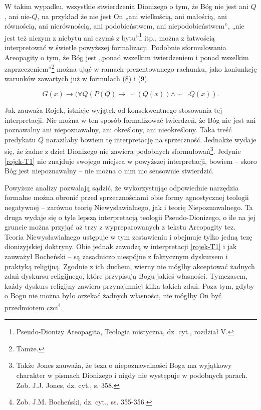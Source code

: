 W takim wypadku, wszystkie stwierdzenia Dionizego o tym, że Bóg nie jest
ani $Q$, ani nie-$Q$, na przykład że nie jest On „ani wielkością, ani
małością, ani równością, ani nierównością, ani podobieństwem, ani
niepodobieństwem”, „nie jest też niczym z niebytu ani czymś z
bytu”\footnote{Pseudo-Dionizy Areopagita, Teologia mistyczna, dz.
cyt., rozdział V. } itp.,  można z łatwością interpretować w
świetle powyższej formalizacji. Podobnie sformułowania Areopagity o
tym, że Bóg jest „ponad wszelkim twierdzeniem i ponad wszelkim
zaprzeczeniem”\footnote{Tamże. } można ująć w ramach
prezentowanego rachunku, jako koniunkcję warunków zawartych już w
formułach (8) i (9).


\begin{equation}
    G(x) \to  (\forall Q (P(Q) \to  \sim\!(Q(x)) \land
\sim\!\neg Q(x)).
\end{equation}



Jak zauważa Rojek, istnieje wyjątek od konsekwentnego stosowania tej
interpretacji. Nie można w ten sposób formalizować  twierdzeń, że Bóg
nie jest ani poznawalny ani niepoznawalny, ani określony, ani
nieokreślony. Taka treść predykatu $Q$ naraziłaby bowiem tę interpretację
na sprzeczność. Jednakże wydaje się, że żadne z dzieł Dionizego nie
zawiera podobnych sformułowań\footnote{Także Jones zauważa, że teza o
niepoznawalności Boga ma wyjątkowy charakter w pismach Dionizego i
nigdy nie występuje w podobnych parach. Zob. J.J. Jones, dz. cyt., s.
358. }. Jedynie \eqref{rojek-T1} nie znajduje swojego miejsca w powyższej
interpretacji, bowiem -- skoro Bóg jest niepoznawalny -- nie można o nim
nic sensownie stwierdzić.

Powyższe analizy pozwalają sądzić, że wykorzystując odpowiednie
narzędzia formalne można obronić przed sprzecznościami obie formy
agnostycznej teologii negatywnej -- zarówno teorię Niewysławialnego, jak
i teorię Niepoznawalnego. Ta druga wydaje się o tyle lepszą
interpretacją teologii Pseudo-Dionizego, o ile na jej gruncie można
przyjąć aż trzy z wypreparowanych z tekstu Areopagity tez. Teoria
Niewysławialnego ustępuje w tym zestawieniu  i obejmuje tylko jedną
tezę dionizyjskiej doktryny. Obie jednak zawodzą w interpretacji \eqref{rojek-T1} i
jak zauważył Bocheński -- są zasadniczo niespójne z faktycznym dyskursem
i praktyką religijną. Zgodnie z ich duchem, wierny nie mógłby
akceptować żadnych zdań dyskursu religijnego, które przypisują Bogu
jakieś własności. Tymczasem, każdy dyskurs religijny zawiera
przynajmniej kilka takich zdań. Poza tym, gdyby o Bogu nie można było
orzekać żadnych własności, nie mógłby On być przedmiotem czci\footnote{
Zob. J.M. Bocheński, dz. cyt., ss. 355-356.}.




